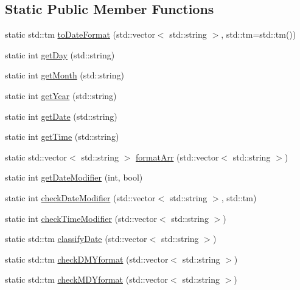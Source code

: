 \subsection*{Static Public Member Functions}
\begin{DoxyCompactItemize}
\item 
static std\+::tm \hyperlink{class_do_lah_1_1_date_time_parser_a7c6b180ae65f821c06e3da405c4e787d}{to\+Date\+Format} (std\+::vector$<$ std\+::string $>$, std\+::tm=std\+::tm())
\item 
static int \hyperlink{class_do_lah_1_1_date_time_parser_a1ab804d9ffd52e22e0b646e520467314}{get\+Day} (std\+::string)
\item 
static int \hyperlink{class_do_lah_1_1_date_time_parser_aacc66f917eed838b97e7fd05aa49beac}{get\+Month} (std\+::string)
\item 
static int \hyperlink{class_do_lah_1_1_date_time_parser_a456ecc41eccc5ec1d7fcb74dc3fc8b29}{get\+Year} (std\+::string)
\item 
static int \hyperlink{class_do_lah_1_1_date_time_parser_a533d484c8d01959703f29aec8a7c1089}{get\+Date} (std\+::string)
\item 
static int \hyperlink{class_do_lah_1_1_date_time_parser_a66151443985e90f8b0ebd59f35feb44e}{get\+Time} (std\+::string)
\item 
static std\+::vector$<$ std\+::string $>$ \hyperlink{class_do_lah_1_1_date_time_parser_a03735027b318f5fb216e3077b32ece3f}{format\+Arr} (std\+::vector$<$ std\+::string $>$)
\item 
static int \hyperlink{class_do_lah_1_1_date_time_parser_a2cc5bed72c78b834ddef92d5258168be}{get\+Date\+Modifier} (int, bool)
\item 
static int \hyperlink{class_do_lah_1_1_date_time_parser_a2f0bb541141139013d7a33d32080c3a0}{check\+Date\+Modifier} (std\+::vector$<$ std\+::string $>$, std\+::tm)
\item 
static int \hyperlink{class_do_lah_1_1_date_time_parser_ab674e193e3492fb70b333c5f7f90b4ca}{check\+Time\+Modifier} (std\+::vector$<$ std\+::string $>$)
\item 
static std\+::tm \hyperlink{class_do_lah_1_1_date_time_parser_a19c642690ef968cb2c63ea488c5d3b09}{classify\+Date} (std\+::vector$<$ std\+::string $>$)
\item 
static std\+::tm \hyperlink{class_do_lah_1_1_date_time_parser_a502238ca6c7e8dc3b813acb7117bf995}{check\+D\+M\+Yformat} (std\+::vector$<$ std\+::string $>$)
\item 
static std\+::tm \hyperlink{class_do_lah_1_1_date_time_parser_a397bf0a22aa556af330b77fc0718d041}{check\+M\+D\+Yformat} (std\+::vector$<$ std\+::string $>$)
\end{DoxyCompactItemize}
